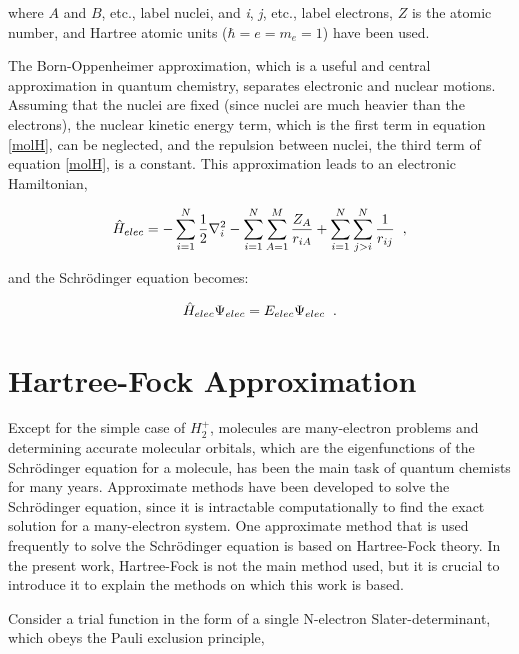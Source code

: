 \noindent where $A$ and $B$, etc., label nuclei, and {\it i}, {\it j}, etc., label electrons, $Z$ is the atomic number, and Hartree atomic units ($\hbar = e= m_e = 1$) have been used.


The Born-Oppenheimer approximation, which is a useful and central approximation in quantum chemistry, separates electronic and nuclear motions. Assuming that the nuclei are fixed (since nuclei are much heavier than the electrons), the nuclear kinetic energy term, which is the first term in equation \eqref{molH}, can be neglected, and the repulsion between nuclei, the third term of equation \eqref{molH}, is a constant. This approximation leads to an electronic Hamiltonian,

\begin{gather}
\label{elecH}
\hat{H}_{elec}=- \sum_{i=1}^{N} \frac{1}{2} \nabla^{2}_{i} - \sum_{i=1}^{N}\sum_{A=1}^{M}\frac{Z_{A}}{r_{iA}} + \sum_{i=1}^{N}\sum_{j>i}^{N} \frac{1}{r_{ij}}\hspace{0.2cm},
\end{gather}

\noindent and the Schr\"{o}dinger equation becomes:

\begin{gather}
\hat{H}_{elec}\Psi_{elec}=E_{elec}\Psi_{elec}\hspace{0.2cm}.
\end{gather}

\section{Hartree-Fock Approximation}

Except for the simple case of $H_2^+$, molecules are many-electron problems and determining accurate molecular orbitals, which are the eigenfunctions of the Schr\"{o}dinger equation for a molecule, has been the main task of quantum chemists for many years. Approximate methods have been developed to solve the Schr\"{o}dinger equation, since it is intractable computationally to find the exact solution for a many-electron system. One approximate method that is used frequently to solve the Schr\"{o}dinger equation is based on Hartree-Fock theory. In the present work, Hartree-Fock is not the main method used, but it is crucial to introduce it to explain the methods on which this work is based.

Consider a trial function in the form of a single N-electron Slater-determinant, which obeys the Pauli exclusion principle,

